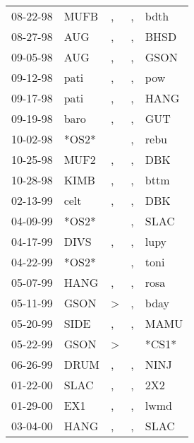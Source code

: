 \begin{supertabular}{lllll}
 08-22-98 &   MUFB &             , &  , &   bdth \\
 08-27-98 &    AUG &             , &  , &   BHSD \\
 09-05-98 &    AUG &             , &  , &   GSON \\
 09-12-98 &   pati &             , &  , &    pow \\
 09-17-98 &   pati &             , &  , &   HANG \\
 09-19-98 &   baro &             , &  , &    GUT \\
 10-02-98 &  *OS2* &               &  , &   rebu \\
 10-25-98 &   MUF2 &             , &  , &    DBK \\
 10-28-98 &   KIMB &             , &  , &   bttm \\
 02-13-99 &   celt &             , &  , &    DBK \\
 04-09-99 &  *OS2* &               &  , &   SLAC \\
 04-17-99 &   DIVS &             , &  , &   lupy \\
 04-22-99 &  *OS2* &               &  , &   toni \\
 05-07-99 &   HANG &             , &  , &   rosa \\
 05-11-99 &   GSON &  \textgreater &  , &   bday \\
 05-20-99 &   SIDE &             , &  , &   MAMU \\
 05-22-99 &   GSON &  \textgreater &    &  *CS1* \\
 06-26-99 &   DRUM &             , &  , &   NINJ \\
 01-22-00 &   SLAC &             , &  , &    2X2 \\
 01-29-00 &    EX1 &             , &  , &   lwmd \\
 03-04-00 &   HANG &             , &  , &   SLAC \\
\end{supertabular}
